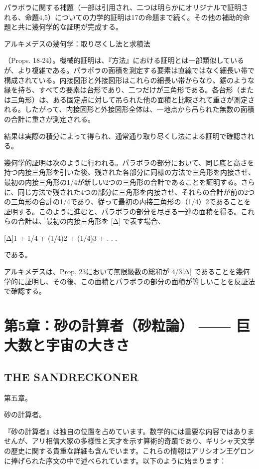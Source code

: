 \documentclass[a4paper,11pt,openany]{ltjsbook}
\begin{document}
パラボラに関する補題（一部は引用され、二つは明らかにオリジナルで証明される、命題4,5）についての力学的証明は17の命題まで続く。その他の補助的命題と共に幾何学的な証明が完成する。

アルキメデスの幾何学：取り尽くし法と求積法

（Props. 18-24）。機械的証明は、『方法』における証明とは一部類似しているが、より複雑である。パラボラの面積を測定する要素は直線ではなく細長い帯で構成されている。内接図形と外接図形はこれらの細長い帯からなり、鋸のような縁を持ち、すべての要素は台形であり、二つだけが三角形である。各台形（または三角形）は、ある固定点に対して吊られた他の面積と比較されて重さが測定される。したがって、内接図形と外接図形全体は、一地点から吊られた無数の面積の合計に重さが測定される。

結果は実際の積分によって得られ、通常通り取り尽くし法による証明で確認される。

幾何学的証明は次のように行われる。パラボラの部分において、同じ底と高さを持つ内接三角形を引いた後、残された各部分に同様の方法で三角形を内接させ、最初の内接三角形の1/4が新しい2つの三角形の合計であることを証明する。さらに、同じ方法で残された4つの部分に三角形を内接させ、それらの合計が前の2つの三角形の合計の1/4であり、従って最初の内接三角形の（1/4）2であることを証明する。このように進むと、パラボラの部分を尽きる一連の面積を得る。これらの合計は、最初の内接三角形を [Δ] で表す場合、

[Δ]{1 + 1/4 + (1/4)2 + (1/4)3 + . . .}

である。

アルキメデスは、Prop. 23において無限級数の総和が 4/3[Δ] であることを幾何学的に証明し、その後、この面積とパラボラの部分の面積が等しいことを反証法で確認する。

\clearpage

\chapter{第5章：砂の計算者（砂粒論） —— 巨大数と宇宙の大きさ}
\section*{THE SANDRECKONER}

第五章。

砂の計算者。

『砂の計算者』は独自の位置を占めています。数学的には重要な内容ではありませんが、アリ相信大家の多様性と天才を示す算術的奇蹟であり、ギリシャ天文学の歴史に関する貴重な詳細も含んでいます。これらの情報はアリシオン王ゲロンに捧げられた序文の中で述べられています。以下のように始まります：
\end{document}
